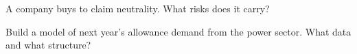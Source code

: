 \begin{interviewq}\label{iq:m3:emissions-and-environmental-markets:5}
A company buys  to claim neutrality. What risks does it carry?
\end{interviewq}

\begin{interviewq}\label{iq:m3:emissions-and-environmental-markets:6}
Build a model of next year's allowance demand from the power sector. What data and what structure?
\end{interviewq}
